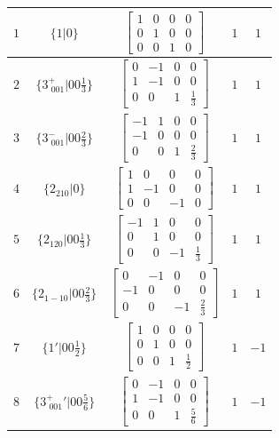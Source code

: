 \documentclass[fleqn,8pt]{jsarticle}
\begin{document}
\begin{longtable}{ccccc}
$ 1 $ & $ \{1|0\} $ & $ \begin{bmatrix} 1 & 0 & 0 & 0 \\ 0 & 1 & 0 & 0 \\ 0 & 0 & 1 & 0 \end{bmatrix} $ & $ 1 $ & $ 1 $ \\ \hline
$ 2 $ & $ \{3^{+}_{\,\,001}|0 0 \frac{1}{3}\} $ & $ \begin{bmatrix} 0 & -1 & 0 & 0 \\ 1 & -1 & 0 & 0 \\ 0 & 0 & 1 & \frac{1}{3} \end{bmatrix} $ & $ 1 $ & $ 1 $ \\ \hline
$ 3 $ & $ \{3^{-}_{\,\,001}|0 0 \frac{2}{3}\} $ & $ \begin{bmatrix} -1 & 1 & 0 & 0 \\ -1 & 0 & 0 & 0 \\ 0 & 0 & 1 & \frac{2}{3} \end{bmatrix} $ & $ 1 $ & $ 1 $ \\ \hline
$ 4 $ & $ \{2{}_{210}|0\} $ & $ \begin{bmatrix} 1 & 0 & 0 & 0 \\ 1 & -1 & 0 & 0 \\ 0 & 0 & -1 & 0 \end{bmatrix} $ & $ 1 $ & $ 1 $ \\ \hline
$ 5 $ & $ \{2{}_{120}|0 0 \frac{1}{3}\} $ & $ \begin{bmatrix} -1 & 1 & 0 & 0 \\ 0 & 1 & 0 & 0 \\ 0 & 0 & -1 & \frac{1}{3} \end{bmatrix} $ & $ 1 $ & $ 1 $ \\ \hline
$ 6 $ & $ \{2{}_{1-10}|0 0 \frac{2}{3}\} $ & $ \begin{bmatrix} 0 & -1 & 0 & 0 \\ -1 & 0 & 0 & 0 \\ 0 & 0 & -1 & \frac{2}{3} \end{bmatrix} $ & $ 1 $ & $ 1 $ \\ \hline
$ 7 $ & $ \{1{}'|0 0 \frac{1}{2}\} $ & $ \begin{bmatrix} 1 & 0 & 0 & 0 \\ 0 & 1 & 0 & 0 \\ 0 & 0 & 1 & \frac{1}{2} \end{bmatrix} $ & $ 1 $ & $ -1 $ \\ \hline
$ 8 $ & $ \{3^{+}_{\,\,001}{}'|0 0 \frac{5}{6}\} $ & $ \begin{bmatrix} 0 & -1 & 0 & 0 \\ 1 & -1 & 0 & 0 \\ 0 & 0 & 1 & \frac{5}{6} \end{bmatrix} $ & $ 1 $ & $ -1 $ \\ \hline

\end{longtable}
\end{document}

